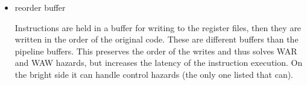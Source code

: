 \begin{itemize}
    \item reorder buffer
    
        Instructions are held in a buffer for writing to the register files, then they are written in the order of the original code.  These are different buffers than the pipeline buffers.  This preserves the order of the writes and thus solves WAR and WAW hazards, but increases the latency of the instruction execution.  On the bright side it can handle control hazards (the only one listed that can).
\end{itemize}

